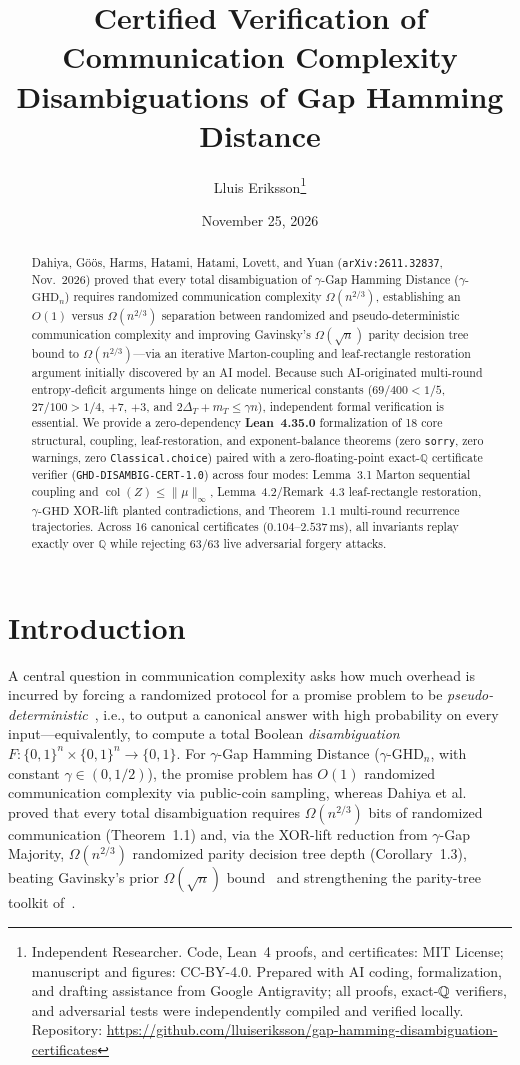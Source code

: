 \documentclass[10pt,twocolumn]{article}
\title{\vspace{-1.1em}\textbf{Certified Verification of Communication Complexity Disambiguations of Gap Hamming Distance}}
\author{Lluis Eriksson\thanks{Independent Researcher. Code, Lean~4 proofs, and certificates: MIT License; manuscript and figures: CC-BY-4.0. Prepared with AI coding, formalization, and drafting assistance from Google Antigravity; all proofs, exact-$\QQ$ verifiers, and adversarial tests were independently compiled and verified locally. Repository: \url{https://github.com/lluiseriksson/gap-hamming-disambiguation-certificates}}}
\date{November 25, 2026}
\newcommand{\QQ}{\mathbb{Q}}
\newcommand{\col}{\operatorname{col}}
\newcommand{\GHD}{\mathrm{GHD}}
\begin{document}
\maketitle
\vspace{-1.4em}

\begin{abstract}
Dahiya, G\"o\"os, Harms, Hatami, Hatami, Lovett, and Yuan (\texttt{arXiv:2611.32837}, Nov.\ 2026) proved that every total disambiguation of $\gamma$-Gap Hamming Distance ($\gamma$-$\GHD_n$) requires randomized communication complexity $\Omega(n^{2/3})$, establishing an $O(1)$ versus $\Omega(n^{2/3})$ separation between randomized and pseudo-deterministic communication complexity and improving Gavinsky's $\Omega(\sqrt{n})$ parity decision tree bound to $\Omega(n^{2/3})$---via an iterative Marton-coupling and leaf-rectangle restoration argument initially discovered by an AI model. Because such AI-originated multi-round entropy-deficit arguments hinge on delicate numerical constants ($69/400 < 1/5$, $27/100 > 1/4$, $+7$, $+3$, and $2\Delta_T + m_T \le \gamma n$), independent formal verification is essential. We provide a zero-dependency \textbf{Lean~4.35.0} formalization of 18 core structural, coupling, leaf-restoration, and exponent-balance theorems (zero \texttt{sorry}, zero warnings, zero \texttt{Classical.choice}) paired with a zero-floating-point exact-$\QQ$ certificate verifier (\texttt{GHD-DISAMBIG-CERT-1.0}) across four modes: Lemma~3.1 Marton sequential coupling and $\col(Z) \le \|\mu\|_\infty$, Lemma~4.2/Remark~4.3 leaf-rectangle restoration, $\gamma$-$\GHD$ XOR-lift planted contradictions, and Theorem~1.1 multi-round recurrence trajectories. Across 16 canonical certificates ($0.104$--$2.537\,\mathrm{ms}$), all invariants replay exactly over $\QQ$ while rejecting 63/63 live adversarial forgery attacks.
\end{abstract}

\section{Introduction}\label{sec:intro}
A central question in communication complexity asks how much overhead is incurred by forcing a randomized protocol for a promise problem to be \emph{pseudo-deterministic}~\cite{gat2011probabilistic}, i.e., to output a canonical answer with high probability on every input---equivalently, to compute a total Boolean \emph{disambiguation} $F : \{0,1\}^n \times \{0,1\}^n \to \{0,1\}$. For $\gamma$-Gap Hamming Distance ($\gamma$-$\GHD_n$, with constant $\gamma \in (0, 1/2)$), the promise problem has $O(1)$ randomized communication complexity via public-coin sampling, whereas Dahiya et al.~\cite{dahiya2026communication} proved that every total disambiguation requires $\Omega(n^{2/3})$ bits of randomized communication (Theorem~1.1) and, via the XOR-lift reduction from $\gamma$-Gap Majority, $\Omega(n^{2/3})$ randomized parity decision tree depth (Corollary~1.3), beating Gavinsky's prior $\Omega(\sqrt{n})$ bound~\cite{gavinsky2025disambiguations} and strengthening the parity-tree toolkit of~\cite{girish2023fourier}.
\end{document}

